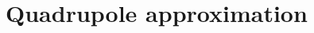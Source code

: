 \documentclass[main.tex]{subfiles}
\begin{document}
\section{Quadrupole approximation}
\end{document}
